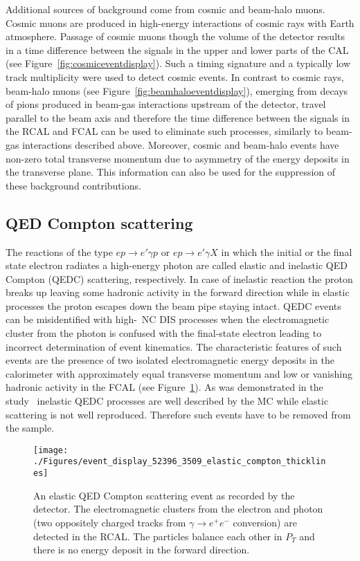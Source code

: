 Additional sources of background come from cosmic and beam-halo muons. Cosmic muons are produced in high-energy interactions of cosmic rays with Earth atmosphere. Passage of cosmic muons though the volume of the detector results in a time difference between the signals in the upper and lower parts of the CAL (see Figure~\ref{fig:cosmiceventdisplay}). Such a timing signature and a typically low track multiplicity were used to detect cosmic events. In contrast to cosmic rays, beam-halo muons (see Figure~\ref{fig:beamhaloeventdisplay}), emerging from decays of pions produced in beam-gas interactions upstream of the detector, travel parallel to the beam axis and therefore the time difference between the signals in the RCAL and FCAL can be used to eliminate such processes, similarly to beam-gas interactions described above. Moreover, cosmic and beam-halo events have non-zero total transverse momentum due to asymmetry of the energy deposits in the transverse plane. This information can also be used for the suppression of these background contributions. 

\subsection{QED Compton scattering}
The reactions of the type $ep \rightarrow e' \gamma p$ or $ep \rightarrow e'\gamma X$ in which the initial or the final state electron radiates a high-energy photon are called elastic and inelastic QED Compton (QEDC) scattering, respectively. In case of inelastic reaction the proton breaks up leaving some hadronic activity in the forward direction while in elastic processes the proton escapes down the beam pipe staying intact. QEDC events can be misidentified with high-\qsq~NC DIS processes when the electromagnetic cluster from the photon is confused with the final-state electron leading to incorrect determination of event kinematics. The characteristic features of such events are the presence of two isolated electromagnetic energy deposits in the calorimeter with approximately equal transverse momentum and low or vanishing hadronic activity in the FCAL (see Figure~\ref{fig:qedceventdisplay}). As was demonstrated in the study~\cite{thesis:moritz:2001} inelastic QEDC processes are well described by the \djangoh MC while elastic scattering is not well reproduced. Therefore such events have to be removed from the sample.

\begin{figure}[htbp]
	\centering
	\texttt{[image: ./Figures/event\_display\_52396\_3509\_elastic\_compton\_thicklines]} 
	\caption{An elastic QED Compton scattering event as recorded by the \zeus detector. The electromagnetic clusters from the electron and photon (two oppositely charged tracks from $\gamma \rightarrow e^+e^-$ conversion) are detected in the RCAL. The particles balance each other in $P_T$ and there is no energy deposit in the forward direction.}
	\label{fig:qedceventdisplay}
\end{figure}


